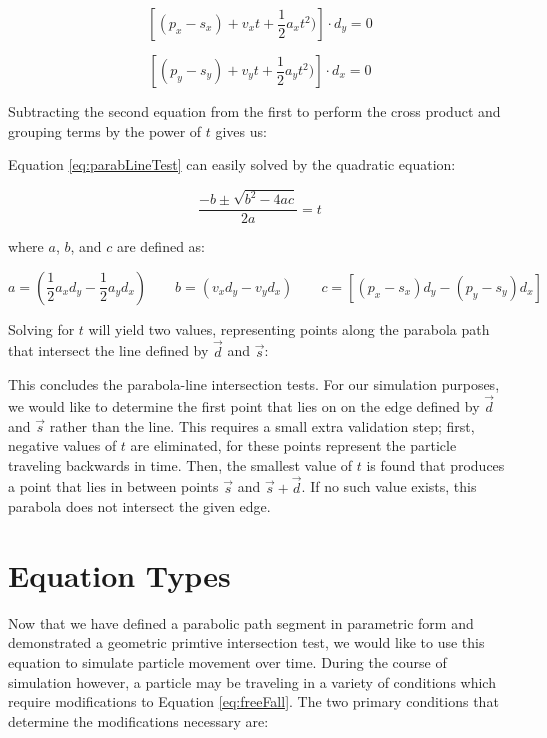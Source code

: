 $$
\left [ (p_x - s_x) + v_x  t + \frac{1}{2} a_x  t^2) \right ] \cdot  d_y = 0
$$

\vspace{0.1in}

$$
\left [ (p_y - s_y) + v_y t + \frac{1}{2} a_y t^2) \right ] \cdot d_x = 0
$$

Subtracting the second equation from the first to perform the cross product and grouping terms by the power of $t$ gives us:


 {
	\label{eq:parabLineTest}
}

Equation \eqref{eq:parabLineTest} can easily solved by the quadratic equation:

$$
	\frac{-b \pm \sqrt{b^2 - 4ac}}{2a} = t
$$

where $a$, $b$, and $c$ are defined as:

$$
a = (\frac{1}{2} a_x d_y - \frac{1}{2} a_y d_x) \qquad b = (v_x d_y - v_y d_x) \qquad c = \left [ (p_x - s_x) d_y - (p_y - s_y) d_x \right ]
$$

Solving for $t$ will yield two values, representing points along the parabola path that intersect the line defined by $\vec{d}$ and $\vec{s}$:


This concludes the parabola-line intersection tests. For our simulation purposes, we would like to determine the first point that lies on on the edge defined by $\vec{d}$ and $\vec{s}$ rather than the line. This requires a small extra validation step; first, negative values of $t$ are eliminated, for these points represent the particle traveling backwards in time. Then, the smallest value of $t$ is found that produces a point that lies in between points $\vec{s}$ and $\vec{s} + \vec{d}$. If no such value exists, this parabola does not intersect the given edge.

\section{Equation Types}

Now that we have defined a parabolic path segment in parametric form and demonstrated a geometric primtive intersection test, we would like to use this equation to simulate particle movement over time. During the course of simulation however, a particle may be traveling in a variety of conditions which require modifications to Equation \eqref{eq:freeFall}. The two primary conditions that determine the modifications necessary are:

